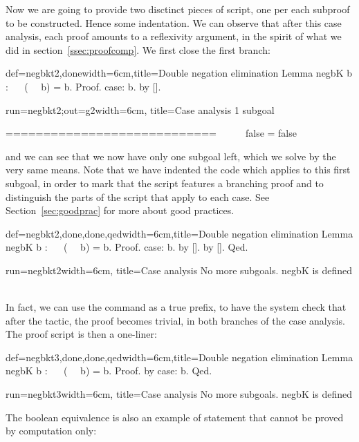 Now we are going to provide two disctinct pieces of script, one per
each subproof to be constructed. Hence some indentation. We can
observe that after this case analysis, each proof amounts to a
reflexivity argument, in the spirit of what we did in
section~\ref{ssec:proofcomp}. We first close the first branch:

\begin{coq}{def=negbkt2,done}{width=6cm,title=Double negation elimination}
Lemma negbK b : ~~ (~~ b) = b.
Proof.
case: b.
  by [].
\end{coq}
\begin{coqout}{run=negbkt2;out=g2}{width=6cm, title=Case analysis}
1 subgoal

 ============================
   ~~ ~~ false = false
\end{coqout}

and we can see that we now have only one subgoal left, which we solve
by the very same means. Note that we have indented the code which
applies to this first subgoal, in order to mark that the script
features a branching proof and to distinguish the parts of the script
that apply to each case. See Section~\ref{sec:goodprac} for more about good
practices.


\begin{coq}{def=negbkt2,done,done,qed}{width=6cm,title=Double negation elimination}
Lemma negbK b : ~~ (~~ b) = b.
Proof.
case: b.
  by [].
by [].
Qed.
\end{coq}
\begin{coqout}{run=negbkt2}{width=6cm, title=Case analysis}
No more subgoals.
negbK is defined
$~$
$~$
$~$
$~$
\end{coqout}

In fact, we can use the  command as a true prefix, to have the
system check that after the  tactic, the proof becomes
trivial, in both branches of the case analysis. The proof script is
then a one-liner:

\begin{coq}{def=negbkt3,done,done,qed}{width=6cm,title=Double negation elimination}
Lemma negbK b : ~~ (~~ b) = b.
Proof. by case: b. Qed.
\end{coq}
\begin{coqout}{run=negbkt3}{width=6cm, title=Case analysis}
No more subgoals.
negbK is defined
\end{coqout}

The boolean equivalence  is also an example of statement that
cannot be proved by computation only:

